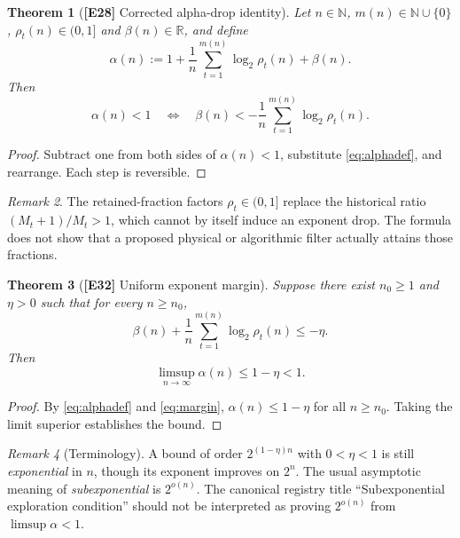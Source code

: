 \documentclass[11pt,letterpaper]{article}
\newtheorem{theorem}{Theorem}[section]
\theoremstyle{definition}
\theoremstyle{remark}
\newtheorem{remark}[theorem]{Remark}
\newcommand{\R}{\mathbb R}
\newcommand{\N}{\mathbb N}
\newcommand{\id}[1]{\textnormal{\textbf{[#1]}}}
\begin{document}
\begin{theorem}[\id{E28} Corrected alpha-drop identity]\label{thm:alpha}
Let $n\in\N$, $m(n)\in\N\cup\{0\}$, $\rho_t(n)\in(0,1]$ and
$\beta(n)\in\R$, and define
\begin{equation}\label{eq:alphadef}
\alpha(n):=1+\frac1n\sum_{t=1}^{m(n)}\log_2\rho_t(n)+\beta(n).
\end{equation}
Then
\begin{equation}\label{eq:alphacriterion}
\alpha(n)<1
\quad\Longleftrightarrow\quad
\beta(n)<-\frac1n\sum_{t=1}^{m(n)}\log_2\rho_t(n).
\end{equation}
\end{theorem}
\begin{proof}
Subtract one from both sides of $\alpha(n)<1$, substitute
\eqref{eq:alphadef}, and rearrange. Each step is reversible.
\end{proof}
\begin{remark}
The retained-fraction factors $\rho_t\in(0,1]$ replace the historical
ratio $(M_t+1)/M_t>1$, which cannot by itself induce an exponent drop.
The formula does not show that a proposed physical or algorithmic filter
actually attains those fractions.
\end{remark}

\begin{theorem}[\id{E32} Uniform exponent margin]\label{thm:margin}
Suppose there exist $n_0\ge1$ and $\eta>0$ such that for every
$n\ge n_0$,
\begin{equation}\label{eq:margin}
\beta(n)+\frac1n\sum_{t=1}^{m(n)}\log_2\rho_t(n)\le-\eta.
\end{equation}
Then
\begin{equation*}
\boxed{\limsup_{n\to\infty}\alpha(n)\le1-\eta<1}.
\end{equation*}
\end{theorem}
\begin{proof}
By \eqref{eq:alphadef} and \eqref{eq:margin},
$\alpha(n)\le1-\eta$ for all $n\ge n_0$. Taking the limit superior
establishes the bound.
\end{proof}
\begin{remark}[Terminology]
A bound of order $2^{(1-\eta)n}$ with $0<\eta<1$ is still
\emph{exponential} in $n$, though its exponent improves on $2^n$.
The usual asymptotic meaning of \emph{subexponential} is $2^{o(n)}$.
The canonical registry title ``Subexponential exploration condition''
should not be interpreted as proving $2^{o(n)}$ from $\limsup\alpha<1$.
\end{remark}
\end{document}
